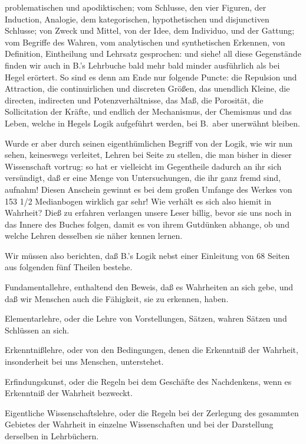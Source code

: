 problematischen und apodiktischen; vom Schlusse, den vier Figuren, der Induction, Analogie, dem kategorischen, hypothetischen und disjunctiven Schlusse; von Zweck und Mittel, von der Idee, dem Individuo, und der Gattung; vom Begriffe des Wahren, vom analytischen und synthetischen Erkennen, von Definition, Eintheilung und Lehrsatz gesprochen: und siehe! all diese Gegenstände finden wir auch in B.'s Lehrbuche bald mehr bald minder ausführlich als bei Hegel erörtert. So sind es denn am Ende nur folgende Puncte: die Repulsion und Attraction, die continuirlichen und discreten Größen, das unendlich Kleine, die directen, indirecten und Potenzverhältnisse, das Maß, die Porosität, die Sollicitation der Kräfte, und endlich der Mechanismus, der Chemismus und das Leben, welche in Hegels Logik aufgeführt werden, bei B.\ aber unerwähnt bleiben. \par
Wurde er aber durch seinen eigenthümlichen Begriff von der Logik, wie wir nun sehen, keineswegs verleitet, Lehren bei Seite zu stellen, die man bisher in dieser Wissenschaft vortrug: so hat er vielleicht im Gegentheile dadurch an ihr sich versündigt, daß er eine Menge von Untersuchungen, die ihr ganz fremd sind, aufnahm! Diesen Anschein gewinnt es bei dem großen Umfange des Werkes von 153 1/2 Medianbogen wirklich gar sehr! Wie verhält es sich also hiemit in Wahrheit? Dieß zu erfahren verlangen unsere Leser billig, bevor sie uns noch in das Innere des Buches folgen, damit es von ihrem Gutdünken abhange, ob und welche Lehren desselben sie näher kennen lernen. \par
Wir müssen also berichten, daß B.'s Logik nebst einer Einleitung von 68 Seiten aus folgenden fünf Theilen bestehe.\par
\begin{compactenum}[1)]
\item Fundamentallehre, enthaltend den Beweis, daß es Wahrheiten an sich gebe, und daß wir Menschen auch die Fähigkeit, sie zu erkennen, haben. \item Elementarlehre, oder die Lehre von Vorstellungen, Sätzen, wahren Sätzen und Schlüssen an sich.
\item Erkenntnißlehre, oder von den Bedingungen, denen die Erkenntniß der Wahrheit, insonderheit bei uns Menschen, unterstehet.
\item Erfindungskunst, oder die Regeln bei dem Geschäfte des Nachdenkens, wenn es Erkenntniß der Wahrheit bezweckt.
\item Eigentliche Wissenschaftslehre, oder die Regeln bei der Zerlegung des gesammten Gebietes der Wahrheit in einzelne Wissenschaften und bei der Darstellung derselben in Lehrbüchern.
\end{compactenum}
